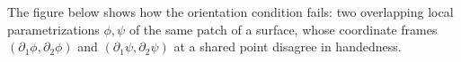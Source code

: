
The figure below shows how the orientation condition fails:
two overlapping local parametrizations $\phi, \psi$ of the same patch of a surface, whose
coordinate frames $(\partial_1\phi,\partial_2\phi)$ and $(\partial_1\psi,\partial_2\psi)$ at a
shared point disagree in handedness.

